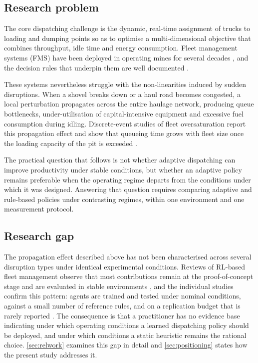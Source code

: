 \documentclass[11pt,a4paper]{article}
\begin{document}
\subsection{Research problem}
\label{sec:problem-statement}

The core dispatching challenge is the dynamic, real-time assignment of trucks to loading and dumping points so as to optimise a multi-dimensional objective that combines throughput, idle time and energy consumption. Fleet management systems (FMS) have been deployed in operating mines for several decades \cite{Afrapoli2017, AlexandraNewman2010}, and the decision rules that underpin them are well documented \cite{MohanMunirathinam1994, Alarie2002}.

These systems nevertheless struggle with the non-linearities induced by sudden disruptions. When a shovel breaks down or a haul road becomes congested, a local perturbation propagates across the entire haulage network, producing queue bottlenecks, under-utilisation of capital-intensive equipment and excessive fuel consumption during idling. Discrete-event studies of fleet oversaturation report this propagation effect and show that queueing time grows with fleet size once the loading capacity of the pit is exceeded \cite{Zeng2022, NecmettinCetin2004}.

The practical question that follows is not whether adaptive dispatching can improve productivity under stable conditions, but whether an adaptive policy remains preferable when the operating regime departs from the conditions under which it was designed. Answering that question requires comparing adaptive and rule-based policies under contrasting regimes, within one environment and one measurement protocol.

\subsection{Research gap}
\label{sec:gap}

The propagation effect described above has not been characterised across several disruption types under identical experimental conditions. Reviews of RL-based fleet management observe that most contributions remain at the proof-of-concept stage and are evaluated in stable environments \cite{Hazrathosseini2024}, and the individual studies confirm this pattern: agents are trained and tested under nominal conditions, against a small number of reference rules, and on a replication budget that is rarely reported \cite{deCarvalho2023, Zhao2025, Pei2025, FranciscoRosales2025}. The consequence is that a practitioner has no evidence base indicating under which operating conditions a learned dispatching policy should be deployed, and under which conditions a static heuristic remains the rational choice. \cref{sec:relwork} examines this gap in detail and \cref{sec:positioning} states how the present study addresses it.
\end{document}
